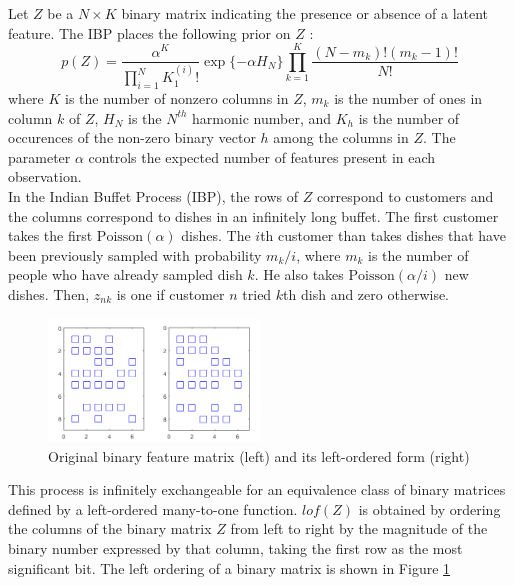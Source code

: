 Let $Z$ be a $N\times K$ binary matrix indicating the presence or absence of a latent feature. The IBP places the following prior on $Z$ \cite{ibp2011}:
\begin{equation}
    p(Z) = \frac{\alpha^K}{\prod_{i=1}^{N}K_{1}^{(i)}!}\exp\{-\alpha H_N\}\prod_{k=1}^{K}\frac{(N-m_k)!(m_k-1)!}{N!}
\end{equation}
where $K$ is the number of nonzero columns in $Z$, $m_k$ is the number of ones in column $k$ of $Z$, $H_N$ is the $N^{th}$ harmonic number, and $K_h$ is the number of occurences of the non-zero binary vector $h$ among the columns in $Z$. The parameter $\alpha$ controls the expected number of features present in each observation.\\

In the Indian Buffet Process (IBP), the rows of $Z$ correspond to customers and the columns correspond to dishes in an infinitely long buffet. The first customer takes the first $\mathrm{Poisson}(\alpha)$ dishes. The $i$th customer than takes dishes that have been previously sampled with probability $m_k/i$, where $m_k$ is the number of people who have already sampled dish $k$. He also takes $\mathrm{Poisson}(\alpha/i)$ new dishes. Then, $z_{nk}$ is one if customer $n$ tried $k$th dish and zero otherwise.

\begin{figure}[thpb]
    \centering
    \includegraphics[width=0.5\textwidth, trim={10 10 10 10}]{figures/lof_feature_matrix.png}
    \caption{Original binary feature matrix (left) and its left-ordered form (right)}
    \label{fig:lof}
\end{figure}

This process is infinitely exchangeable for an equivalence class of binary matrices defined by a left-ordered many-to-one function. $lof(Z)$ is obtained by ordering the columns of the binary matrix $Z$ from left to right by the magnitude of the binary number expressed by that column, taking the first row as the most significant bit. The left ordering of a binary matrix is shown in Figure \ref{fig:lof}\\

